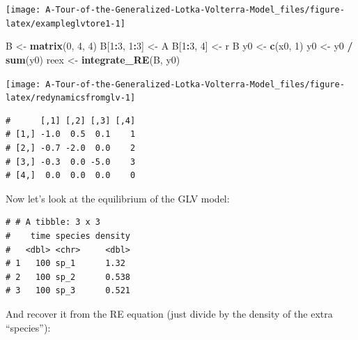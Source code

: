 \documentclass[]{book}
\newenvironment{Shaded}{\begin{snugshade}}{\end{snugshade}}
\newcommand{\DecValTok}[1]{\textcolor[rgb]{0.00,0.00,0.81}{#1}}
\newcommand{\KeywordTok}[1]{\textcolor[rgb]{0.13,0.29,0.53}{\textbf{#1}}}
\newcommand{\NormalTok}[1]{#1}
\newcommand{\OperatorTok}[1]{\textcolor[rgb]{0.81,0.36,0.00}{\textbf{#1}}}
\newcommand{\StringTok}[1]{\textcolor[rgb]{0.31,0.60,0.02}{#1}}
\begin{document}
\begin{center}\texttt{[image: A-Tour-of-the-Generalized-Lotka-Volterra-Model\_files/figure-latex/exampleglvtore1-1]} \end{center}

\begin{Shaded}
\begin{Highlighting}[]
\NormalTok{B <-}\StringTok{ }\KeywordTok{matrix}\NormalTok{(}\DecValTok{0}\NormalTok{, }\DecValTok{4}\NormalTok{, }\DecValTok{4}\NormalTok{)}
\NormalTok{B[}\DecValTok{1}\OperatorTok{:}\DecValTok{3}\NormalTok{, }\DecValTok{1}\OperatorTok{:}\DecValTok{3}\NormalTok{] <-}\StringTok{ }\NormalTok{A}
\NormalTok{B[}\DecValTok{1}\OperatorTok{:}\DecValTok{3}\NormalTok{, }\DecValTok{4}\NormalTok{] <-}\StringTok{ }\NormalTok{r}
\NormalTok{B}
\NormalTok{y0 <-}\StringTok{ }\KeywordTok{c}\NormalTok{(x0, }\DecValTok{1}\NormalTok{)}
\NormalTok{y0 <-}\StringTok{ }\NormalTok{y0 }\OperatorTok{/}\StringTok{ }\KeywordTok{sum}\NormalTok{(y0)}
\NormalTok{reex <-}\StringTok{ }\KeywordTok{integrate_RE}\NormalTok{(B, y0)}
\end{Highlighting}
\end{Shaded}

\begin{center}\texttt{[image: A-Tour-of-the-Generalized-Lotka-Volterra-Model\_files/figure-latex/redynamicsfromglv-1]} \end{center}

\begin{verbatim}
#      [,1] [,2] [,3] [,4]
# [1,] -1.0  0.5  0.1    1
# [2,] -0.7 -2.0  0.0    2
# [3,] -0.3  0.0 -5.0    3
# [4,]  0.0  0.0  0.0    0
\end{verbatim}

Now let's look at the equilibrium of the GLV model:

\begin{Shaded}
\end{Shaded}

\begin{verbatim}
# # A tibble: 3 x 3
#    time species density
#   <dbl> <chr>     <dbl>
# 1   100 sp_1      1.32 
# 2   100 sp_2      0.538
# 3   100 sp_3      0.521
\end{verbatim}

And recover it from the RE equation (just divide by the density of the extra ``species''):
\end{document}
